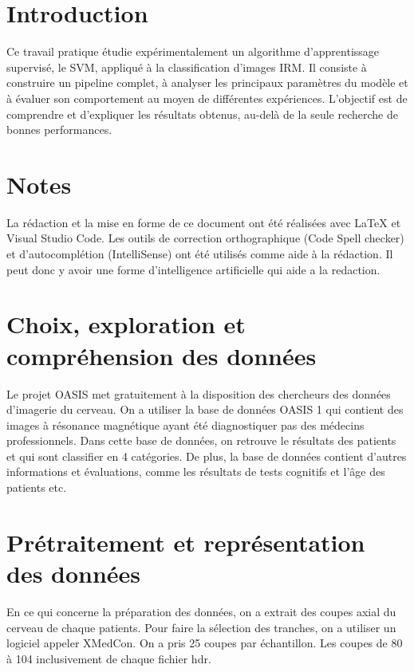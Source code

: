 \documentclass[12pt,twoside,letterpaper]{article}
\begin{document}



\tableofcontents
\newpage

\section{Introduction}
Ce travail pratique étudie expérimentalement un algorithme d'apprentissage supervisé, le SVM, 
appliqué à la classification d'images IRM. Il consiste à construire un pipeline complet, à analyser 
les principaux paramètres du modèle et à évaluer son comportement au moyen de différentes expériences. 
L'objectif est de comprendre et d'expliquer les résultats obtenus, au-delà de la seule recherche de 
bonnes performances.\newline

\section*{Notes}
La rédaction et la mise en forme de ce document ont été réalisées avec LaTeX et 
Visual Studio Code. Les outils de correction orthographique (Code Spell checker) et d'autocomplétion 
(IntelliSense) ont été utilisés comme aide à la rédaction. Il peut donc y avoir une forme d'intelligence
artificielle qui aide a la redaction.

\section{Choix, exploration et compréhension des données}
Le projet OASIS\cite{noauthor_open_nodate} met gratuitement à la disposition des chercheurs des données d'imagerie du 
cerveau. On a utiliser la base de données OASIS 1 qui contient des images à résonance magnétique
ayant été diagnostiquer pas des médecins professionnels. Dans cette base de données, on retrouve 
le résultats des patients et qui sont classifier en 4 catégories. De plus, la base de données contient 
d'autres informations et évaluations, comme les résultats de tests cognitifs et l'âge des patients etc.

\newpage
\section{Prétraitement et représentation des données}
En ce qui concerne la préparation des données, on a extrait des coupes axial du cerveau de chaque 
patients. Pour faire la sélection des tranches, on a utiliser un logiciel appeler XMedCon\cite{noauthor_xmedcon_nodate}. On a
pris 25 coupes par échantillon. Les coupes de 80 à 104 inclusivement de chaque fichier hdr.
\newline
\end{document}
